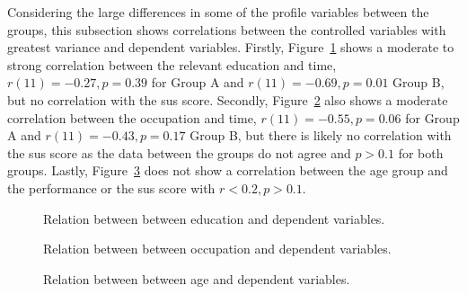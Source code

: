 Considering the large differences in some of the profile variables between the groups, this subsection shows correlations between the controlled variables with greatest variance and dependent variables.
Firstly, Figure~\ref{fig:plot-correlation-education} shows a moderate to strong correlation between the relevant education and time, $r(11) = -0.27, p = 0.39$ for Group A and $r(11) = -0.69, p = 0.01$ Group B, but no correlation with the \gls{sus} score.
Secondly, Figure~\ref{fig:plot-correlation-occupation} also shows a moderate correlation between the occupation and time, $r(11) = -0.55, p = 0.06$ for Group A and $r(11) = -0.43, p = 0.17$ Group B, but there is likely no correlation with the \gls{sus} score as the data between the groups do not agree and $p > 0.1$ for both groups.
Lastly, Figure~\ref{fig:plot-correlation-age} does not show a correlation between the age group and the performance or the \gls{sus} score with $r < 0.2, p > 0.1$.

\begin{figure}[H]
    
    \caption{Relation between between education and dependent variables.}
    \label{fig:plot-correlation-education}
\end{figure}

\begin{figure}[H]
    
    \caption{Relation between between occupation and dependent variables.}
    \label{fig:plot-correlation-occupation}
\end{figure}

\begin{figure}[H]
    
    \caption{Relation between between age and dependent variables.}
    \label{fig:plot-correlation-age}
\end{figure}
